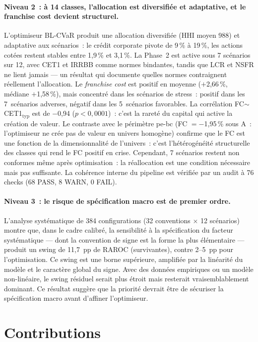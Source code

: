 \documentclass[10pt, a4paper, oneside]{report}
\theoremstyle{definition}
\begin{document}
\paragraph{Niveau 2~: à 14 classes, l'allocation est diversifiée et adaptative, et le franchise cost devient structurel.} L'optimiseur BL-CVaR produit une allocation diversifiée (HHI moyen 988) et adaptative aux scénarios~: le crédit corporate pivote de 9\,\% à 19\,\%, les actions cotées restent stables entre 1{,}9\,\% et 3{,}1\,\%. La Phase~2 est active sous 7 scénarios sur 12, avec CET1 et IRRBB comme normes bindantes, tandis que LCR et NSFR ne lient jamais --- un résultat qui documente quelles normes contraignent réellement l'allocation. Le \emph{franchise cost} est positif en moyenne ($+$2{,}66\,\%, médiane $+$1{,}58\,\%), mais concentré dans les scénarios de stress~: positif dans les 7~scénarios adverses, négatif dans les 5~scénarios favorables. La corrélation FC$\sim$CET1$_{\text{typ}}$ est de $-$0{,}94 ($p < 0{,}0001$)~: c'est la rareté du capital qui active la création de valeur. Le contraste avec le périmètre pe-bc (FC $= -$1{,}95\,\% sous A~: l'optimiseur ne crée pas de valeur en univers homogène) confirme que le FC est une fonction de la dimensionnalité de l'univers~: c'est l'hétérogénéité structurelle des classes qui rend le FC positif en crise. Cependant, 7 scénarios restent non conformes même après optimisation~: la réallocation est une condition nécessaire mais pas suffisante. La cohérence interne du pipeline est vérifiée par un audit à 76 checks (68 PASS, 8 WARN, 0 FAIL).

\paragraph{Niveau 3~: le risque de spécification macro est de premier ordre.} L'analyse systématique de 384 configurations (32 conventions $\times$ 12 scénarios) montre que, dans le cadre calibré, la sensibilité à la spécification du facteur systématique --- dont la convention de signe est la forme la plus élémentaire --- produit un swing de 11{,}7~pp de RAROC (survivantes), contre 2--5~pp pour l'optimisation. Ce swing est une borne supérieure, amplifiée par la linéarité du modèle et le caractère global du signe. Avec des données empiriques ou un modèle non-linéaire, le swing résiduel serait plus étroit mais resterait vraisemblablement dominant. Ce résultat suggère que la priorité devrait être de sécuriser la spécification macro avant d'affiner l'optimiseur.

\section*{Contributions}
\end{document}
